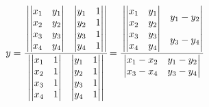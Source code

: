 \begin{align*}
  y &= \cfrac{
      \begin{vmatrix}
        \begin{vmatrix} x_1 & y_1 \\ x_2 & y_2 \end{vmatrix} & \begin{vmatrix} y_1 & 1 \\ y_2 & 1 \end{vmatrix} \\
        \begin{vmatrix} x_3 & y_3 \\ x_4 & y_4 \end{vmatrix} & \begin{vmatrix} y_3 & 1 \\ y_4 & 1 \end{vmatrix} 
      \end{vmatrix}}{
      \begin{vmatrix}
        \begin{vmatrix} x_1 & 1 \\ x_2 & 1 \end{vmatrix} & \begin{vmatrix} y_1 & 1 \\ y_2 & 1 \end{vmatrix} \\
        \begin{vmatrix} x_3 & 1 \\ x_4 & 1 \end{vmatrix} & \begin{vmatrix} y_3 & 1 \\ y_4 & 1 \end{vmatrix} 
      \end{vmatrix}}
    = \cfrac{
      \begin{vmatrix}
        \begin{vmatrix} x_1 & y_1 \\ x_2 & y_2 \end{vmatrix} & y_1 - y_2 \\
        \begin{vmatrix} x_3 & y_3 \\ x_4 & y_4 \end{vmatrix} & y_3 - y_4 
      \end{vmatrix}}{
      \begin{vmatrix}
        x_1 - x_2 & y_1 - y_2 \\
        x_3 - x_4 & y_3 - y_4 
      \end{vmatrix}}
\end{align*}

